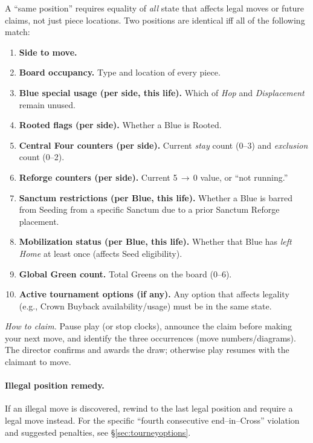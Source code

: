 \documentclass[11pt]{article}
\begin{document}
\begin{tcolorbox}[enhanced,breakable,title={Threefold Repetition — Position Equivalence},colback=white,colframe=royal,boxrule=0.8pt]
\small
A “same position” requires equality of \emph{all} state that affects legal moves or future claims, not just piece locations. Two positions are identical iff all of the following match:
\begin{enumerate}[leftmargin=1.5em,itemsep=0.2em]
  \item \textbf{Side to move.}
  \item \textbf{Board occupancy.} Type and location of every piece.
  \item \textbf{Blue special usage (per side, this life).} Which of \emph{Hop} and \emph{Displacement} remain unused.
  \item \textbf{Rooted flags (per side).} Whether a Blue is Rooted.
  \item \textbf{Central Four counters (per side).} Current \emph{stay} count (0–3) and \emph{exclusion} count (0–2).
  \item \textbf{Reforge counters (per side).} Current 5\,$\to$\,0 value, or “not running.”
  \item \textbf{Sanctum restrictions (per Blue, this life).} Whether a Blue is barred from Seeding from a specific Sanctum due to a prior Sanctum Reforge placement.
  \item \textbf{Mobilization status (per Blue, this life).} Whether that Blue has \emph{left Home} at least once (affects Seed eligibility).
  \item \textbf{Global Green count.} Total Greens on the board (0–6).
  \item \textbf{Active tournament options (if any).} Any option that affects legality (e.g., Crown Buyback availability/usage) must be in the same state.
\end{enumerate}
\textit{How to claim.} Pause play (or stop clocks), announce the claim before making your next move, and identify the three occurrences (move numbers/diagrams). The director confirms and awards the draw; otherwise play resumes with the claimant to move.
\end{tcolorbox}

\paragraph{Illegal position remedy.}
If an illegal move is discovered, rewind to the last legal position and require a legal move instead. For the specific “fourth consecutive end–in–Cross” violation and suggested penalties, see §\ref{sec:tourneyoptions}.
\end{document}
